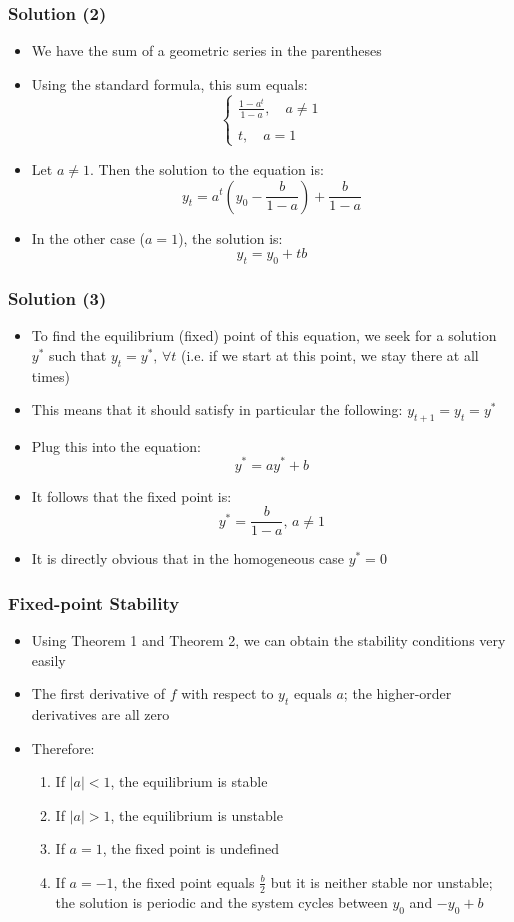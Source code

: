 \documentclass[10pt,usenames,dvipsnames]{beamer}
\theoremstyle{definition}
\begin{document}
\begin{frame}[fragile]
\frametitle{Solution (2)}
\begin{itemize}
	\item We have the sum of a geometric series in the parentheses
	\item Using the standard formula, this sum equals:
	\[
	\left\{
	\begin{array}{lcl}
			 \displaystyle \frac{1 - a^{t}}{1-a},\quad a\neq 1\\
			 \quad\\
			 t, \quad a = 1 
	\end{array}
	\right.
	\]
	\item Let $a\neq 1$. Then the solution to the equation is:
	\[
		y_{t} = a^{t}\left(y_{0} - \frac{b}{1-a}\right) + \frac{b}{1-a}
	\]
	\item In the other case ($a=1$), the solution is:
	\[
		y_{t} = y_{0} + tb
	\]
\end{itemize}
\end{frame}

\begin{frame}[fragile]
\frametitle{Solution (3)}
\begin{itemize}
	\item To find the equilibrium (fixed) point of this equation, we seek for a solution $y^{*}$ such that $y_{t} = y^{*},\,\forall t$ (i.e. if we start at this point, we stay there at all times)
	\item This means that it should satisfy in particular the following: $y_{t+1} = y_{t} = y^{*}$
	\item Plug this into the equation:
	\[
		y^{*} = ay^{*} + b
	\]
	\item It follows that the fixed point is:
	\[
		y^{*} = \frac{b}{1-a},\, a \neq 1
	\]
	\item It is directly obvious that in the homogeneous case $y^{*} = 0$
\end{itemize}
\end{frame}

\begin{frame}[fragile]
\frametitle{Fixed-point Stability}
\begin{itemize}
	\item Using Theorem 1 and Theorem 2, we can obtain the stability conditions very easily
	\item The first derivative of $f$ with respect to $y_{t}$ equals $a$; the higher-order derivatives are all zero
	\item Therefore:
	\begin{enumerate}
		\item If $|a| < 1$, the equilibrium is stable
		\item If $|a| > 1$, the equilibrium is unstable
		\item If $a = 1$, the fixed point is undefined
		\item If $a = -1$, the fixed point equals $\displaystyle \frac{b}{2}$ but it is neither stable nor unstable; the solution is periodic and the system cycles between $y_{0}$ and $-y_{0} + b$
	\end{enumerate}
\end{itemize}
\end{frame}
\end{document}
